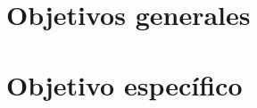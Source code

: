 \lipsum[0-1]


\section*{Objetivos generales}
\lipsum[0-1]


\section*{Objetivo específico}
\lipsum[0-1]